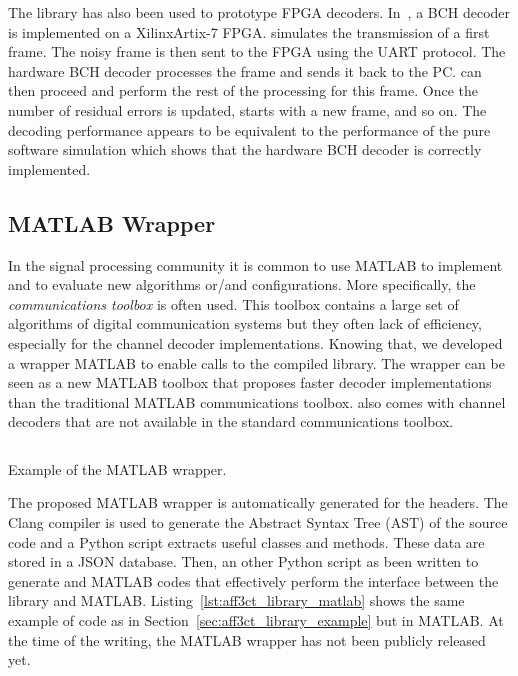 The \AFFECT library has also been used to prototype FPGA decoders.
In~\cite{Cassagne2017a}, a BCH decoder is implemented on a Xilinx\R Artix-7
FPGA. \AFFECT simulates the transmission of a first frame. The noisy frame is
then sent to the FPGA using the UART protocol. The hardware BCH decoder
processes the frame and sends it back to the PC. \AFFECT can then proceed and
perform the rest of the processing for this frame. Once the number of residual
errors is updated, \AFFECT starts with a new frame, and so on. The decoding
performance appears to be equivalent to the performance of the pure software
simulation which shows that the hardware BCH decoder is correctly implemented.

\subsection{MATLAB Wrapper}

In the signal processing community it is common to use MATLAB to implement and
to evaluate new algorithms or/and configurations. More specifically, the
\emph{communications toolbox} is often used. This toolbox contains a large set
of algorithms of digital communication systems but they often lack of
efficiency, especially for the channel decoder implementations. Knowing that,
we developed a wrapper MATLAB to enable calls to the compiled \AFFECT library.
The wrapper can be seen as a new MATLAB toolbox that proposes faster decoder
implementations than the traditional MATLAB communications toolbox. \AFFECT
also comes with channel decoders that are not available in the standard
communications toolbox.

\begin{listing}[htp]
  \inputminted[frame=lines,linenos]{matlab}{\curChapter/src/use_cases/library/repetition_chain.m}
  \caption{Example of the \AFFECT MATLAB wrapper.}
  \label{lst:aff3ct_library_matlab}
\end{listing}

The proposed MATLAB wrapper is automatically generated for the \AFFECT headers.
The Clang compiler is used to generate the Abstract Syntax Tree (AST) of the
\AFFECT source code and a Python script extracts useful classes and methods.
These data are stored in a JSON database. Then, an other Python script as been
written to generate \Cxx and MATLAB codes that effectively perform the interface
between the \AFFECT library and MATLAB. Listing~\ref{lst:aff3ct_library_matlab}
shows the same example of code as in Section~\ref{sec:aff3ct_library_example}
but in MATLAB. At the time of the writing, the MATLAB wrapper has not been
publicly released yet.

